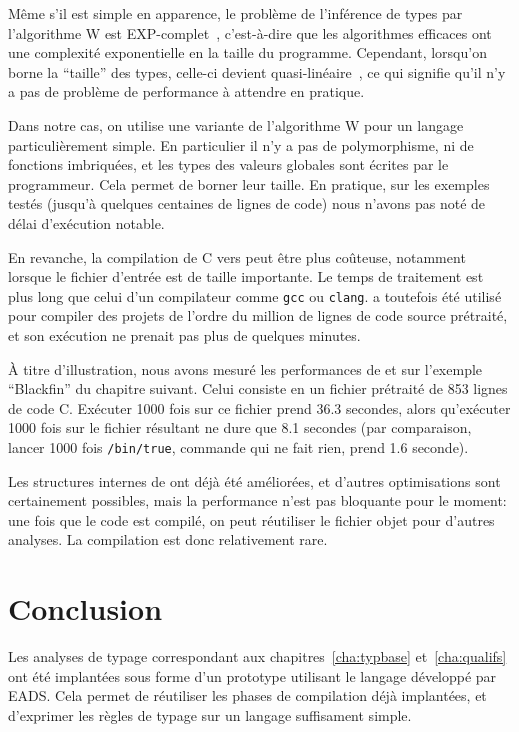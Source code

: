 
Même s'il est simple en apparence, le problème de l'inférence de types par
l'algorithme W est EXP-complet~\cite{mairson}, c'est-à-dire que les algorithmes
efficaces ont une complexité exponentielle en la taille du programme. Cependant,
lorsqu'on borne la \enquote{taille} des types, celle-ci devient
quasi-linéaire~\cite{rta03}, ce qui signifie qu'il n'y a pas de problème de
performance à attendre en pratique.

Dans notre cas, on utilise une variante de l'algorithme W pour un langage
particulièrement simple. En particulier il n'y a pas de polymorphisme, ni de
fonctions imbriquées, et les types des valeurs globales sont écrites par le
programmeur. Cela permet de borner leur taille. En pratique, sur les exemples
testés (jusqu'à quelques centaines de lignes de code) nous n'avons pas noté de
délai d'exécution notable.

En revanche, la compilation de C vers \newspeak peut être plus coûteuse,
notamment lorsque le fichier d'entrée est de taille importante. Le temps de
traitement est plus long que celui d'un compilateur comme \texttt{gcc} ou
\texttt{clang}. \ctonewspeak a toutefois été utilisé pour compiler des projets
de l'ordre du million de lignes de code source prétraité, et son exécution ne
prenait pas plus de quelques minutes.

À titre d'illustration, nous avons mesuré les performances de \ctonewspeak et
\ptrtype sur l'exemple \enquote{Blackfin} du chapitre suivant. Celui consiste en
un fichier prétraité de 853 lignes de code C. Exécuter 1000 fois \ctonewspeak
sur ce fichier prend 36.3 secondes, alors qu'exécuter 1000 fois \ptrtype sur le
fichier \newspeak résultant ne dure que 8.1 secondes (par comparaison, lancer
1000 fois \texttt{/bin/true}, commande qui ne fait rien, prend 1.6 seconde).

Les structures internes de \ctonewspeak ont déjà été améliorées, et d'autres
optimisations sont certainement possibles, mais la performance n'est pas
bloquante pour le moment: une fois que le code est compilé, on peut réutiliser
le fichier objet \newspeak pour d'autres analyses. La compilation est donc
relativement rare.

\section*{Conclusion}

Les analyses de typage correspondant aux chapitres~\ref{cha:typbase}
et~\ref{cha:qualifs} ont été implantées sous forme d'un prototype utilisant le
langage \newspeak développé par EADS. Cela permet de réutiliser les phases de
compilation déjà implantées, et d'exprimer les règles de typage sur un langage
suffisament simple.

